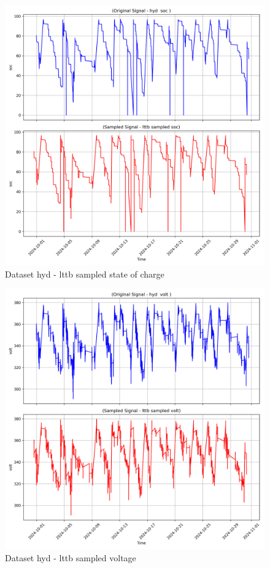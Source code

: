 \begin{figure}
    \centering
    \includegraphics[width=1\linewidth]{screenshots/hyd/lttb_sampled_soc_screenshot.png}
    \caption{Dataset hyd - lttb sampled state of charge }
    \label{fig:hyd_lttb_sampled_soc_screenshot}
\end{figure}
\begin{figure}
    \centering
    \includegraphics[width=1\linewidth]{screenshots/hyd/lttb_sampled_volt_screenshot.png}
    \caption{Dataset hyd - lttb sampled voltage }
    \label{fig:hyd_lttb_sampled_volt_screenshot}
\end{figure}
